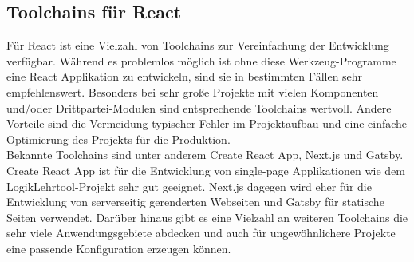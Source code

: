 \subsection{Toolchains für React}
Für React ist eine Vielzahl von Toolchains zur Vereinfachung der Entwicklung verfügbar. Während es problemlos möglich ist ohne diese Werkzeug-Programme eine React Applikation zu entwickeln, sind sie in bestimmten Fällen sehr empfehlenswert. Besonders bei sehr große Projekte mit vielen Komponenten und/oder Drittpartei-Modulen sind entsprechende Toolchains wertvoll. Andere Vorteile sind die Vermeidung typischer Fehler im Projektaufbau und eine einfache Optimierung des Projekts für die Produktion.\\
Bekannte Toolchains sind unter anderem Create React App, Next.js und Gatsby. Create React App ist für die Entwicklung von single-page Applikationen wie dem LogikLehrtool-Projekt sehr gut geeignet. Next.js dagegen wird eher für die Entwicklung von serverseitig gerenderten Webseiten und Gatsby für statische Seiten verwendet. Darüber hinaus gibt es eine Vielzahl an weiteren Toolchains die sehr viele Anwendungsgebiete abdecken und auch für ungewöhnlichere Projekte eine passende Konfiguration erzeugen können.
\pagebreak
